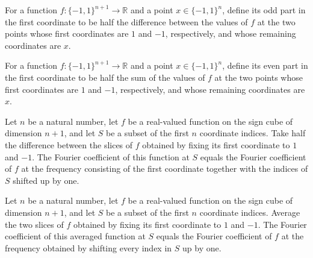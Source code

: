 \begin{definition}
\label{FABL.hypercontractiveOddPart}
\leanok
{}
For a function $f : \{−1,1\}^{n+1} \to \mathbb{R}$ and a point $x \in \{−1,1\}^n$,
define its odd part in the first coordinate to be half the difference between the values
of $f$ at the two points whose first coordinates are $1$ and $-1$, respectively, and
whose remaining coordinates are $x$.
\end{definition}

\begin{definition}
\label{FABL.hypercontractiveEvenPart}
\leanok
{}
For a function $f : \{−1,1\}^{n+1} \to \mathbb{R}$ and a point $x \in \{−1,1\}^n$,
define its even part in the first coordinate to be half the sum of the values of $f$ at
the two points whose first coordinates are $1$ and $-1$, respectively, and whose
remaining coordinates are $x$.
\end{definition}

\begin{theorem}
\label{FABL.fourierCoeff_hypercontractiveOddPart}
\leanok
{}
Let $n$ be a natural number, let $f$ be a real-valued function on the sign cube of
dimension $n+1$, and let $S$ be a subset of the first $n$ coordinate indices. Take half
the difference between the slices of $f$ obtained by fixing its first coordinate to $1$
and $-1$. The Fourier coefficient of this function at $S$ equals the Fourier coefficient
of $f$ at the frequency consisting of the first coordinate together with the indices of
$S$ shifted up by one.
\end{theorem}

\begin{theorem}
\label{FABL.fourierCoeff_hypercontractiveEvenPart}
\leanok
{}
Let $n$ be a natural number, let $f$ be a real-valued function on the sign cube of
dimension $n+1$, and let $S$ be a subset of the first $n$ coordinate indices. Average
the two slices of $f$ obtained by fixing its first coordinate to $1$ and $-1$. The
Fourier coefficient of this averaged function at $S$ equals the Fourier coefficient of
$f$ at the frequency obtained by shifting every index in $S$ up by one.
\end{theorem}

